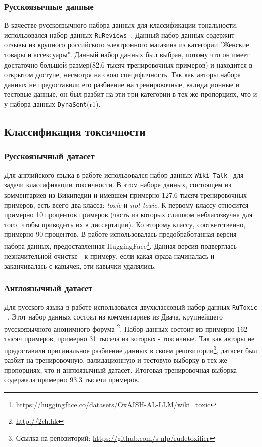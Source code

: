 \subsubsection{Русскоязычные данные} 
В качестве русскоязычного набора данных для классификации тональности, использовался набор данных \texttt{RuReviews}~\cite{ru_sentiment}. Данный набор данных содержит отзывы из крупного российского электронного магазина из категории "Женские товары и ассексуары". Данный набор данных был выбран, потому что он имеет достаточно большой размер(82.6 тысяч тренировочных примеров) и находится в открытом доступе, несмотря на свою специфичность. Так как авторы набора данных не предоставили его разбиение на тренировочные, валидационные и тестовые данные, он был разбит на эти три категории в тех же пропорциях, что и у набора данных
 \texttt{DynaSent}(r1). 

\subsection{Классификация токсичности}
\subsubsection{Русскоязычный датасет} 
Для английского языка в работе использовался набор данных  \texttt{Wiki Talk}~\cite{toxic} для задачи классификации токсичности. В этом наборе данных, состоящем из комментариев из Википедии и имевшем примерно 127.6 тысяч тренировочных примеров, есть всего два класса: \textit{toxic} и \textit{not toxic}. К первому классу относится примерно 10 процентов примеров (часть из которых слишком неблагозвучна для того, чтобы приводить их в диссертации). Ко второму классу, соответственно, примерно 90 процентов.  В работе использовалась предобработанная версия набора данных, предоставленная HuggingFace\footnote{\url{https://huggingface.co/datasets/OxAISH-AL-LLM/wiki_toxic}}. Данная версия подверглась незначительной очистке - к примеру, если какая фраза начиналась и заканчивалась с кавычек, эти кавычки удалялись.  
\subsubsection{Англоязычный датасет}
Для русского языка в работе использовался двухклассовый набор данных \texttt{RuToxic} ~\cite{ru_toxic}. Этот набор данных состоял из комментариев из Двача, крупнейшего русскоязычного анонимного форума \footnote{\url{http://2ch.hk}}. Набор данных состоит из примерно 162 тысяч примеров, примерно 31 тысяча из которых - токсичные. Так как авторы не предоставили оригинальное разбиение данных в своем репозитории\footnote{Ссылка на репозиторий: \url{https://github.com/s-nlp/rudetoxifier}}, датасет был разбит на тренировочную, валидационную и тестовую выборку в тех же пропорциях, что и англоязычный датасет. Итоговая тренировочная выборка содержала примерно 93.3 тысячи примеров. 

